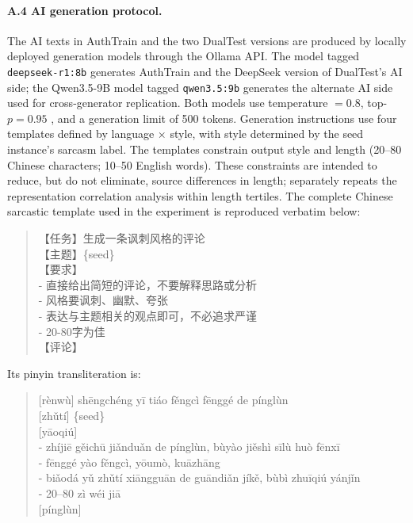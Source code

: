 \label{app:a4}\paragraph{A.4 AI generation protocol.} The AI texts in AuthTrain and the two DualTest versions are produced by locally deployed generation models through the Ollama API. The model tagged \texttt{deepseek-r1:8b} generates AuthTrain and the DeepSeek version of DualTest's AI side; the Qwen3.5-9B model tagged \texttt{qwen3.5:9b} generates the alternate AI side used for cross-generator replication. Both models use temperature $= 0.8$, top-$p = 0.95$ \citep{holtzman2020nucleus}, and a generation limit of 500 tokens. Generation instructions use four templates defined by language $\times$ style, with style determined by the seed instance's sarcasm label. The templates constrain output style and length (20--80 Chinese characters; 10--50 English words). These constraints are intended to reduce, but do not eliminate, source differences in length;  separately repeats the representation correlation analysis within length tertiles. The complete Chinese sarcastic template used in the experiment is reproduced verbatim below:

\begin{quote}\small\ttfamily
【任务】生成一条讽刺风格的评论\\
【主题】\{seed\}\\
【要求】\\
- 直接给出简短的评论，不要解释思路或分析\\
- 风格要讽刺、幽默、夸张\\
- 表达与主题相关的观点即可，不必追求严谨\\
- 20-80字为佳\\
【评论】
\end{quote}

Its pinyin transliteration is:

\begin{quote}\small
{[}rènwù{]} shēngchéng yī tiáo fěngcì fēnggé de pínglùn\\
{[}zhǔtí{]} \{seed\}\\
{[}yāoqiú{]}\\
- zhíjiē gěichū jiǎnduǎn de pínglùn, bùyào jiěshì sīlù huò fēnxī\\
- fēnggé yào fěngcì, yōumò, kuāzhāng\\
- biǎodá yǔ zhǔtí xiāngguān de guāndiǎn jíkě, bùbì zhuīqiú yánjǐn\\
- 20--80 zì wéi jiā\\
{[}pínglùn{]}
\end{quote}


